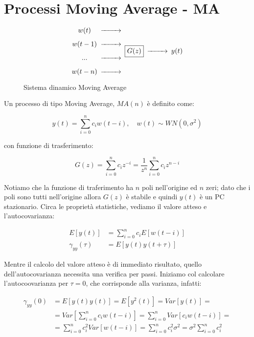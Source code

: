 \section{Processi Moving Average - MA}

\begin{figure}[htbp]\Large
  \centering
  \[
    \begin{CD}
      \begin{CD}
        w(t) @>>>\\
        w(t-1) @>>>\\
          ...  @>>>\\
        w(t-n) @>>>
      \end{CD}
      \framebox{$G(z)$} @>>> y(t)
    \end{CD}
  \]
  \caption{Sistema dinamico Moving Average \label{fig:ma}}
\end{figure}

\noindent Un processo di tipo Moving Average, $MA(n)$ è definito come:

  \[ y(t)=\sum_{i=0}^{n}{c_iw(t-i)}, \quad w(t) \sim WN(0,\sigma^2) \]

\noindent con funzione di trasferimento:

  \[ G(z)=\sum_{i=0}^{n}{c_iz^{-i}}=\frac{1}{z^n}\sum_{i=0}^{n}{c_iz^{n-i}} \]



Notiamo che la funzione di traferimento ha $n$ poli nell'origine ed $n$ zeri; dato che i poli sono tutti nell'origine allora $G(z)$ è stabile e quindi $y(t)$ è un PC stazionario. Circa le proprietà statistiche, vediamo il valore atteso e l'autocovarianza:

  \begin{align*}
    E[y(t)]&=\sum_{i=0}^{n}{c_iE[w(t-i)]}\\
    \gamma_{yy}(\tau)&=E[y(t)y(t+\tau)]
  \end{align*}

Mentre il calcolo del valore atteso è di immediato risultato, quello dell'autocovarianza necessita una verifica per passi. Iniziamo col calcolare l'autocoovarianza per $\tau=0$, che corrisponde alla varianza, infatti:

  \[ 
    \begin{split}
  \gamma_{yy}(0)&=E[y(t)y(t)]=E[y^2(t)]=Var[y(t)]=\\
                &=Var[\sum_{i=0}^{n}{c_iw(t-i)}]=\sum_{i=0}^{n}{Var[c_iw(t-i)]}=\\
                &=\sum_{i=0}^{n}{c_i^2Var[w(t-i)]}=\sum_{i=0}^{n}{c_i^2\sigma^2}=\sigma^2\sum_{i=0}^{n}{c_i^2} 
    \end{split}
  \]
  
